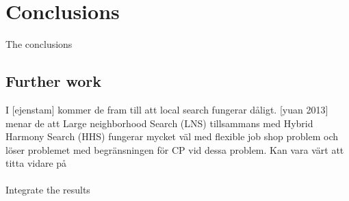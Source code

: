 \chapter{Conclusions} \label{cha:conc}
The conclusions

\section{Further work}
I [ejenstam] kommer de fram till att local search fungerar dåligt.\cite{ejenstam_2014} [yuan 2013] menar de att Large neighborhood Search (LNS) tillsammans med Hybrid Harmony Search (HHS) fungerar mycket väl med flexible job shop problem och löser problemet med begränsningen för CP vid dessa problem.\cite{yuan_2013} Kan vara värt att titta vidare på
\\\\
\cite{Bjordal} Integrate the results